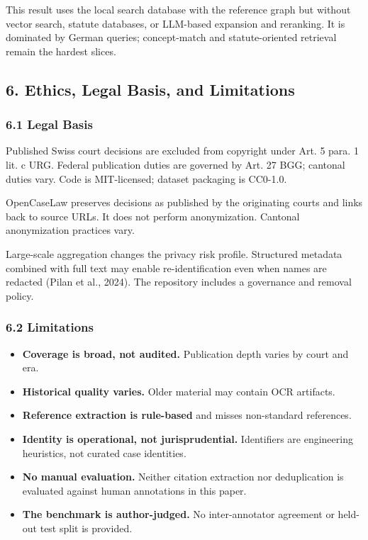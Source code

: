 \documentclass[
  11pt,
]{article}
\providecommand{\tightlist}{%
  \setlength{\itemsep}{0pt}\setlength{\parskip}{0pt}}
\begin{document}
This result uses the local search database with the reference graph but
without vector search, statute databases, or LLM-based expansion and
reranking. It is dominated by German queries; concept-match and
statute-oriented retrieval remain the hardest slices.

\subsection{6. Ethics, Legal Basis, and
Limitations}\label{ethics-legal-basis-and-limitations}

\subsubsection{6.1 Legal Basis}\label{legal-basis}

Published Swiss court decisions are excluded from copyright under Art. 5
para. 1 lit. c URG. Federal publication duties are governed by Art. 27
BGG; cantonal duties vary. Code is MIT-licensed; dataset packaging is
CC0-1.0.

OpenCaseLaw preserves decisions as published by the originating courts
and links back to source URLs. It does not perform anonymization.
Cantonal anonymization practices vary.

Large-scale aggregation changes the privacy risk profile. Structured
metadata combined with full text may enable re-identification even when
names are redacted (Pilan et al., 2024). The repository includes a
governance and removal policy.

\subsubsection{6.2 Limitations}\label{limitations}

\begin{itemize}
\tightlist
\item
  \textbf{Coverage is broad, not audited.} Publication depth varies by
  court and era.
\item
  \textbf{Historical quality varies.} Older material may contain OCR
  artifacts.
\item
  \textbf{Reference extraction is rule-based} and misses non-standard
  references.
\item
  \textbf{Identity is operational, not jurisprudential.} Identifiers are
  engineering heuristics, not curated case identities.
\item
  \textbf{No manual evaluation.} Neither citation extraction nor
  deduplication is evaluated against human annotations in this paper.
\item
  \textbf{The benchmark is author-judged.} No inter-annotator agreement
  or held-out test split is provided.
\end{itemize}
\end{document}
